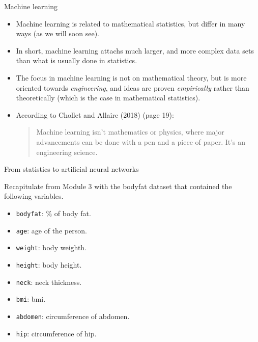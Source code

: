 \documentclass[10pt,ignorenonframetext,]{beamer}
\providecommand{\tightlist}{%
  \setlength{\itemsep}{0pt}\setlength{\parskip}{0pt}}
\begin{document}
\begin{frame}

\begin{block}{Machine learning}

\begin{itemize}
\item
  Machine learning is related to mathematical statistics, but differ in
  many ways (as we will soon see).
\item
  In short, machine learning attachs much larger, and more complex data
  sets than what is usually done in statistics.
\item
  The focus in machine learning is not on mathematical theory, but is
  more oriented towards \emph{engineering}, and ideas are proven
  \emph{empirically} rather than theoretically (which is the case in
  mathematical statistics).
\item
  According to Chollet and Allaire (2018) (page 19):

  \begin{quote}Machine learning isn't mathematics or physics, where major advancements can be done with a pen and a piece of paper. It's an engineering science.\end{quote}
\end{itemize}

\end{block}

\end{frame}

\begin{frame}[fragile]{From statistics to artificial neural networks}

Recapitulate from Module 3 with the bodyfat dataset that contained the
following variables.

\begin{itemize}
\tightlist
\item
  \texttt{bodyfat}: \% of body fat.
\item
  \texttt{age}: age of the person.
\item
  \texttt{weight}: body weighth.
\item
  \texttt{height}: body height.
\item
  \texttt{neck}: neck thickness.
\item
  \texttt{bmi}: bmi.
\item
  \texttt{abdomen}: circumference of abdomen.
\item
  \texttt{hip}: circumference of hip.
\end{itemize}

\end{frame}
\end{document}
